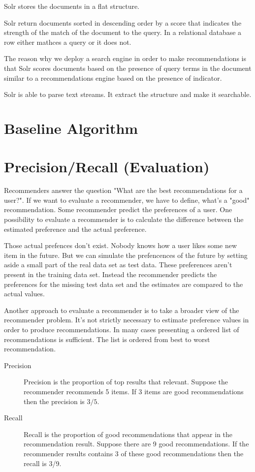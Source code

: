 \documentclass[twoside,a4paper]{article}
\begin{document}
Solr stores the documents in a flat structure.

Solr return documents sorted in descending order by a score that indicates the strength of the match of the document to the query. In a relational database a row either mathces a query or it does not.

The reason why we deploy a search engine in order to make recommendations is that Solr scores documents based on the presence of query terms in the document similar to a recommendations engine based on the presence of indicator.

Solr is able to parse text streams. It extract the structure and make it searchable.

\section{Baseline Algorithm}
\label{sec:baselinealgorithm}

\section{Precision/Recall (Evaluation)}
\label{sec:evaluation}
Recommenders answer the question "What are the best recommendations for a user?". If we want to evaluate a recommender, we have to define, what's a "good" recommendation.
Some recommender predict the preferences of a user. One possibility to evaluate a recommender is to calculate the difference between the estimated preference and the actual preference.

Those actual prefences don't exist. Nobody knows how a user likes some new item in the future.
But we can simulate the prefencences of the future by setting aside a small part of the real data set as test data. These preferences aren't present in the training data set. Instead the recommender predicts the preferences for the missing test data set and the estimates are compared to the actual values.

Another approach to evaluate a recommender is to take a broader view of the recommender problem. It's not strictly necessary to estimate preference values in order to produce recommendations. In many cases presenting a ordered list of recommendations is sufficient. The list is ordered from best to worst recommendation.

\begin{description}
\item[Precision] Precision is the proportion of top results that relevant. Suppose the recommender recommends 5 items. If 3 items are good recommendations then the precision is $3/5$.
\item[Recall] Recall is the proportion of good recommendations that appear in the recommendation result. Suppose there are 9 good recommendations. If the recommender results contains 3 of these good recommendations then the recall is 3/9.
\end{description}
\end{document}
